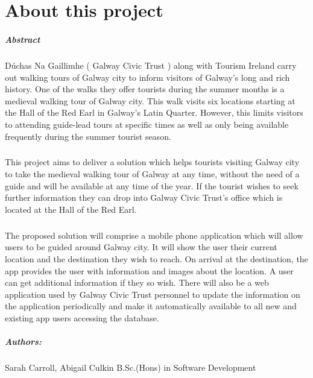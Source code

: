 
\chapter*{About this project}
\paragraph{Abstract}

Dúchas Na Gaillimhe ( Galway Civic Trust ) along with Tourism Ireland carry out walking tours of Galway city to inform visitors of Galway's long and rich history. One of the walks they offer tourists during the summer months is a medieval walking tour of Galway city. This walk visits six locations starting at the Hall of the Red Earl in Galway’s Latin Quarter. However, this limits visitors to attending guide-lead tours at specific times as well as only being available frequently during the summer tourist season.
\paragraph{}This project aims to deliver a solution which helps tourists visiting Galway city to take the medieval walking tour of Galway at any time, without the need of a guide and will be available at any time of the year. If the tourist wishes to seek further information they can drop into Galway Civic Trust's office which is located at the Hall of the Red Earl.
\paragraph{}
The proposed solution will comprise a mobile phone application which will allow users to be guided around Galway city. It will show the user their current location and the destination they wish to reach. On arrival at the destination, the app provides the user with information and images about the location. A user can get additional information if they so wish. There will also be a web application used by Galway Civic Trust personnel to update the information on the application periodically and make it automatically available to all new and existing app users accessing the database.

\paragraph{Authors:}
Sarah Carroll, Abigail Culkin
B.Sc.(Hons) in Software Development

